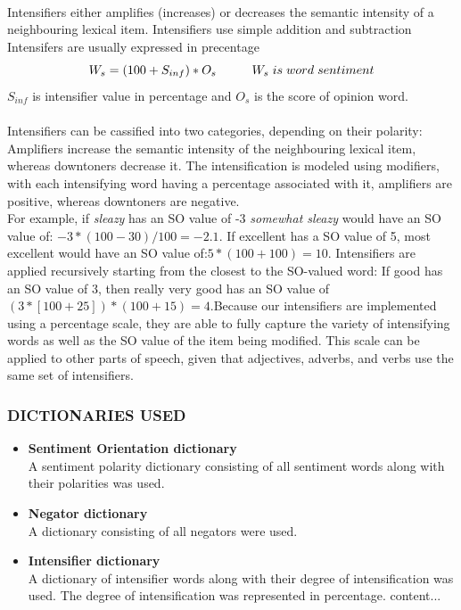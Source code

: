 \paragraph{} Intensifiers either amplifies (increases) or decreases the semantic intensity of a neighbouring lexical item.
Intensifiers use simple addition and subtraction 
Intensifers are usually expressed in precentage
$$
W_s = (100 + S_{inf}) * O_s   \hspace{1cm}
W_s \hspace{0.1cm} is\hspace{0.1cm} word \hspace{0.1cm} sentiment\\ $$ 
$ S_{inf} $ is intensifier value in percentage and $ O_s $ is the score of opinion word.
\\  \\
Intensifiers can be cassified into two categories, depending on their polarity: Amplifiers increase the semantic intensity of the neighbouring lexical item, whereas downtoners decrease it. The intensification is modeled using modifiers, with each intensifying word having a percentage associated with it, amplifiers are positive, whereas downtoners are negative.
\\
For example, if \textit{sleazy} has an SO value of -3 \textit{somewhat sleazy} would have an SO value of: $ -3*(100-30)/100 = -2.1 $. 
If excellent has a SO value of 5, most excellent would
have an SO value of:$ 5 * (100 + 100) = 10$. Intensifiers are applied recursively starting from the closest to the SO-valued word: If good has an SO value of 3, then really very good has an SO value of $ (3 * [100 + 25]) *(100 + 15) = 4 $.Because our intensifiers are implemented using a percentage scale, they are able to fully capture the variety of intensifying words as well as the SO value of the item
being modified. This scale can be applied to other parts of speech, given that adjectives, adverbs, and verbs use the same set of intensifiers.


\subsubsection{DICTIONARIES USED}
\begin{itemize}
	\item \textbf{Sentiment Orientation dictionary} \\
	A sentiment polarity dictionary consisting of all sentiment words along with their polarities was used.
	\item \textbf{Negator dictionary} \\
	A dictionary consisting of all negators were used.
	\item \textbf{Intensifier dictionary} \\
	A dictionary of intensifier words along with their degree of intensification was used. The degree of intensification was represented in percentage.
	content...
\end{itemize}
